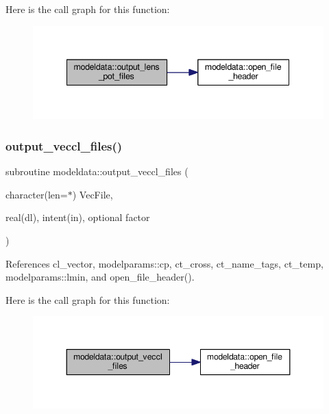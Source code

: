 Here is the call graph for this function\+:
\nopagebreak
\begin{figure}[H]
\begin{center}
\leavevmode
\includegraphics[width=342pt]{namespacemodeldata_a3db0a7cfe521f110aeef7aaa900d1843_cgraph}
\end{center}
\end{figure}
\mbox{\label{namespacemodeldata_a307b673f582637ddd1d7c8557429e040}} 
\subsubsection{\texorpdfstring{output\+\_\+veccl\+\_\+files()}{output\_veccl\_files()}}
{\footnotesize\ttfamily subroutine modeldata\+::output\+\_\+veccl\+\_\+files (\begin{DoxyParamCaption}\item[{character(len=$\ast$)}]{Vec\+File,  }\item[{real(dl), intent(in), optional}]{factor }\end{DoxyParamCaption})}



References cl\+\_\+vector, modelparams\+::cp, ct\+\_\+cross, ct\+\_\+name\+\_\+tags, ct\+\_\+temp, modelparams\+::lmin, and open\+\_\+file\+\_\+header().

Here is the call graph for this function\+:
\nopagebreak
\begin{figure}[H]
\begin{center}
\leavevmode
\includegraphics[width=348pt]{namespacemodeldata_a307b673f582637ddd1d7c8557429e040_cgraph}
\end{center}
\end{figure}
\mbox{\label{namespacemodeldata_af3439e8b84f5875f131343636aa8adee}} 
